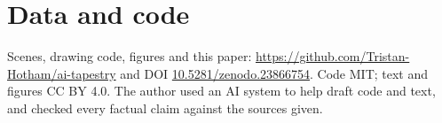 \documentclass[11pt,a4paper]{article}
\begin{document}
\section*{Data and code}
Scenes, drawing code, figures and this paper: \url{https://github.com/Tristan-Hotham/ai-tapestry} and DOI \href{https://doi.org/10.5281/zenodo.23866754}{10.5281/zenodo.23866754}. Code MIT; text and figures CC BY 4.0. The author used an AI system to help draft code and text, and checked every factual claim against the sources given.
\end{document}
